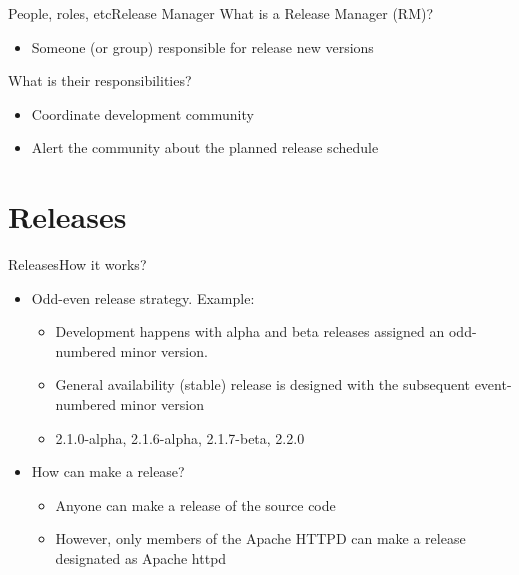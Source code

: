 \documentclass[10pt]{beamer}
\begin{document}
\begin{frame}{People, roles, etc}{Release Manager}
  What is a Release Manager (RM)? \pause
  \begin{itemize}
    \item Someone (or group) responsible for release new versions \pause
  \end{itemize}

  What is their responsibilities? \pause
  \begin{itemize}
    \item Coordinate development community \pause
    \item Alert the community about the planned release schedule
  \end{itemize}
\end{frame}

\section{Releases}

\begin{frame}{Releases}{How it works?}
  \begin{itemize}
    \item Odd-even release strategy. Example: \pause
    \begin{itemize}
      \item Development happens with alpha and beta releases assigned an
            odd-numbered minor version. \pause
      \item General availability (stable) release is designed with the
            subsequent event-numbered minor version \pause
      \item 2.1.0-alpha, 2.1.6-alpha, 2.1.7-beta, 2.2.0 \pause
    \end{itemize}

    \item How can make a release? \pause
      \begin{itemize}
        \item Anyone can make a release of the source code \pause
        \item However, only members of the Apache HTTPD can make a release
              designated as Apache httpd
      \end{itemize}
  \end{itemize}
\end{frame}
\end{document}
